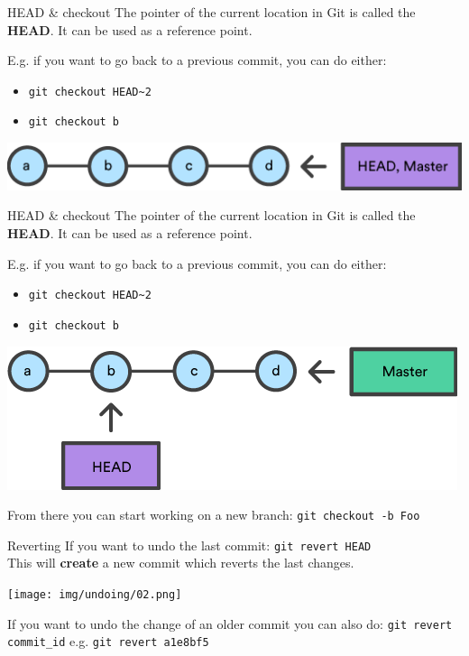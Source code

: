 \documentclass[usenames,dvipsnames,9pt]{beamer}
\begin{document}
\begin{frame}[t]{HEAD \& checkout}
\vspace{0.5cm}
The pointer of the current location in Git is called the \textbf{HEAD}.
It can be used as a reference point.

E.g. if you want to go back to a previous commit, you can do either:
\begin{itemize}
  \item \lstinline|git checkout HEAD~2|
  \item \lstinline|git checkout b|
\end{itemize}

\vspace{0.53cm}
\includegraphics[scale=1.5]{img/undoing/git-sequence-transparent.png}
\end{frame}

\begin{frame}[t]{HEAD \& checkout}
\vspace{0.5cm}
The pointer of the current location in Git is called the \textbf{HEAD}.
It can be used as a reference point.

E.g. if you want to go back to a previous commit, you can do either:
\begin{itemize}
  \item \lstinline|git checkout HEAD~2|
  \item \lstinline|git checkout b|
\end{itemize}

\vspace{0.5cm}
\includegraphics[scale=1.5]{img/undoing/2497537634-git-checkout-transparent.png}

From there you can start working on a new branch: \lstinline|git checkout -b Foo|
\end{frame}

\begin{frame}{Reverting}
If you want to undo the last commit: \lstinline|git revert HEAD|\\
This will \textbf{create} a new commit which reverts the last changes.

\vspace{0.5cm}
\texttt{[image: img/undoing/02.png]}

If you want to undo the change of an older commit you can also do:
\lstinline|git revert commit_id| e.g. \lstinline|git revert a1e8bf5|

\end{frame}
\end{document}
